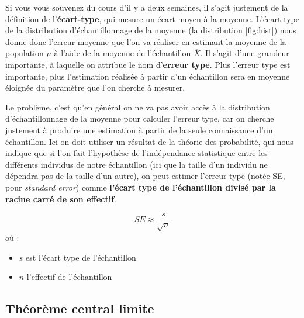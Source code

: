 \documentclass[
]{book}
\providecommand{\tightlist}{%
  \setlength{\itemsep}{0pt}\setlength{\parskip}{0pt}}
\begin{document}
Si vous vous souvenez du cours d'il y a deux semaines, il s'agit justement de la définition de l'\textbf{écart-type}, qui mesure un écart moyen à la moyenne. L'écart-type de la distribution d'échantillonnage de la moyenne (la distribution \ref{fig:hist}) nous donne donc l'erreur moyenne que l'on va réaliser en estimant la moyenne de la population \(\mu\) à l'aide de la moyenne de l'échantillon \(\overline{X}\). Il s'agit d'une grandeur importante, à laquelle on attribue le nom d'\textbf{erreur type}. Plus l'erreur type est importante, plus l'estimation réalisée à partir d'un échantillon sera en moyenne éloignée du paramètre que l'on cherche à mesurer.

Le problème, c'est qu'en général on ne va pas avoir accès à la distribution d'échantillonnage de la moyenne pour calculer l'erreur type, car on cherche justement à produire une estimation à partir de la seule connaissance d'un échantillon. Ici on doit utiliser un résultat de la théorie des probabilité, qui nous indique que si l'on fait l'hypothèse de l'indépendance statistique entre les différents individus de notre échantillon (ici que la taille d'un individu ne dépendra pas de la taille d'un autre), on peut estimer l'erreur type (notée SE, pour \emph{standard error}) comme \textbf{l'écart type de l'échantillon divisé par la racine carré de son effectif}.

\[ SE \approx \frac{s}{\sqrt{n}} \] où :

\begin{itemize}
\tightlist
\item
  \(s\) est l'écart type de l'échantillon
\item
  \(n\) l'effectif de l'échantillon
\end{itemize}

\hypertarget{thuxe9oruxe8me-central-limite}{%
\subsection{Théorème central limite}\label{thuxe9oruxe8me-central-limite}}
\end{document}
